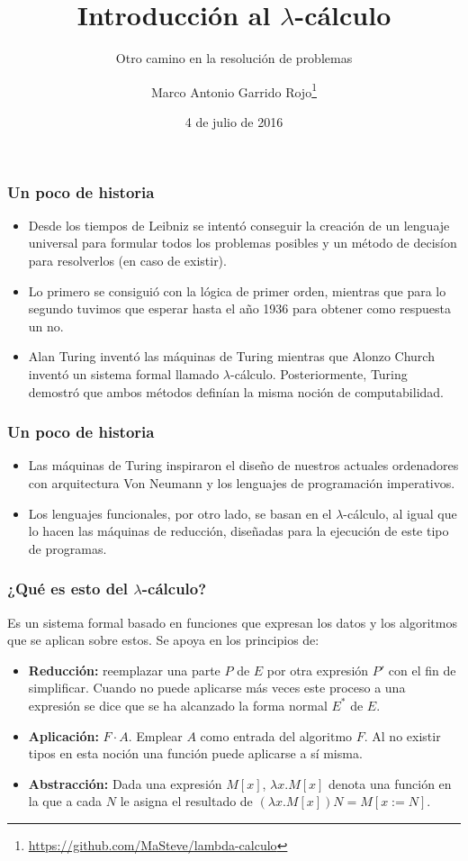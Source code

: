 \documentclass[spanish, a4paper, 12pt, final, slideColor, nototal, colorBG, pdf, noaccumulate, darkblue] {beamer}
\title{Introducción al $\lambda$-cálculo}
\subtitle{Otro camino en la resolución de problemas}
\author{Marco Antonio Garrido Rojo\thanks{\url{https://github.com/MaSteve/lambda-calculo}}}
\date{4 de julio de 2016}
\begin{document}
\maketitle
\begin{frame}
    \frametitle{Un poco de historia}
    \begin{itemize}
        \item Desde los tiempos de Leibniz se intentó conseguir la creación de un lenguaje universal para formular todos los problemas posibles y un método de decisíon para resolverlos (en caso de existir).
        \item Lo primero se consiguió con la lógica de primer orden, mientras que para lo segundo tuvimos que esperar hasta el año 1936 para obtener como respuesta un no.
        \item Alan Turing inventó las máquinas de Turing mientras que Alonzo Church inventó un sistema formal llamado $\lambda$-cálculo. Posteriormente, Turing demostró que ambos métodos definían la misma noción de computabilidad.
    \end{itemize}
\end{frame}
\begin{frame}
    \frametitle{Un poco de historia}
    \begin{itemize}
        \item Las máquinas de Turing inspiraron el diseño de nuestros actuales ordenadores con arquitectura Von Neumann y los lenguajes de programación imperativos.
        \item Los lenguajes funcionales, por otro lado, se basan en el $\lambda$-cálculo, al igual que lo hacen las máquinas de reducción, diseñadas para la ejecución de este tipo de programas.
    \end{itemize}
\end{frame}
\begin{frame}
    \frametitle{¿Qué es esto del $\lambda$-cálculo?}
    Es un sistema formal basado en funciones que expresan los datos y los algoritmos que se aplican sobre estos. Se apoya en los principios de:
    \begin{itemize}
        \item {\textbf{Reducción: } reemplazar una parte $P$ de $E$ por otra expresión $P'$ con el fin de simplificar. Cuando no puede aplicarse más veces este proceso a una expresión se dice que se ha alcanzado la forma normal $E^*$ de $E$.}
        \item {\textbf{Aplicación: } $F\cdot A$. Emplear $A$ como entrada del algoritmo $F$. Al no existir tipos en esta noción una función puede aplicarse a sí misma.}
        \item {\textbf{Abstracción: } Dada una expresión $M[x]$, $\lambda x.M[x]$ denota una función en la que a cada $N$ le asigna el resultado de $(\lambda x.M[x])N = M[x := N]$.} %
    \end{itemize}
\end{frame}
\end{document}
